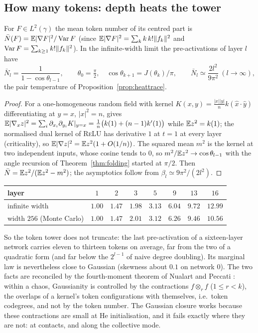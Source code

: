 \subsection{How many tokens: depth heats the tower}
\begin{proposition}\label{prop:tokens}
For $F\in L^2(\gamma)$ the mean token number of its centred part is $\bar N(F)=\mathbb E|\nabla F|^2/\operatorname{Var} F$ (since
$\mathbb E|\nabla F|^2=\sum_kk\,k!\|f_k\|^2$ and $\operatorname{Var} F=\sum_{k\ge1}k!\|f_k\|^2$). In the infinite-width limit the pre-activations of layer $l$
have
\[
\bar N_l=\frac1{1-\cos\theta_{l-1}},\qquad \theta_0=\tfrac\pi2,\quad \cos\theta_{k+1}=J(\theta_k)/\pi ,
\qquad \bar N_l\simeq\frac{2l^2}{9\pi^2}\ (l\to\infty),
\]
the pair temperature of Proposition~\ref{prop:heattrace}.
\end{proposition}
\begin{proof}
For a one-homogeneous random field with kernel $K(x,y)=\tfrac{|x||y|}nk(\hat x\cdot\hat y)$ differentiating at $y=x$, $|x|^2=n$, gives
$\mathbb E|\nabla_xz|^2=\sum_i\partial_{x_i}\partial_{y_i}K|_{y=x}=\tfrac1n\big(k(1)+(n-1)k'(1)\big)$ while $\mathbb E z^2=k(1)$; the normalised dual kernel of \textsc{ReLU} has derivative $1$ at $t=1$ at every layer (criticality), so
$\mathbb E|\nabla z|^2=\mathbb E z^2(1+O(1/n))$. The squared mean $m^2$ is the kernel at two independent inputs, whose cosine tends to $0$, so
$m^2/\mathbb E z^2\to\cos\theta_{l-1}$ with the angle recursion of Theorem~\ref{thm:folding} started at $\pi/2$. Then
$\bar N=\mathbb E z^2/(\mathbb E z^2-m^2)$; the asymptotics follow from $\beta_l\simeq9\pi^2/(2l^2)$.
\end{proof}
\begin{center}\small
\begin{tabular}{lccccccc}\toprule
layer & $1$ & $2$ & $3$ & $5$ & $9$ & $13$ & $16$\\\midrule
infinite width & $1.00$ & $1.47$ & $1.98$ & $3.13$ & $6.04$ & $9.72$ & $12.99$\\
width $256$ (Monte Carlo) & $1.00$ & $1.47$ & $2.01$ & $3.12$ & $6.26$ & $9.46$ & $10.56$\\\bottomrule
\end{tabular}
\end{center}
So the token tower does not truncate: the last pre-activation of a sixteen-layer network carries eleven to thirteen
tokens on average, far from the two of a quadratic form (and far below the $2^{l-1}$ of naive degree doubling).
Its marginal law is nevertheless close to Gaussian (skewness about $0.1$ on network $0$). The two facts are reconciled by the
fourth-moment theorem of Nualart and Peccati \cite{NP}: within a chaos, Gaussianity is controlled by the contractions $f\otimes_rf$
($1\le r<k$), the overlaps of a kernel's token configurations with themselves, i.e.\ token codegrees, and not by the token
number. The Gaussian closure works because these contractions are small at He initialisation, and it fails exactly
where they are not: at contacts, and along the collective mode.

